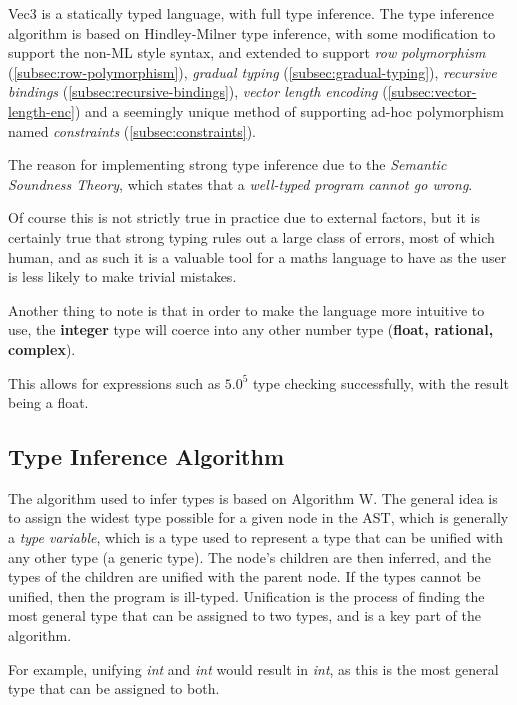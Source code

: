Vec3 is a statically typed language, with full type inference.
The type inference algorithm is based on Hindley-Milner type inference\citep{sulzmann2000general}, with some
modification to support the non-ML style syntax, and extended to support \textit{row polymorphism}\citep{morris2019abstracting} (\ref{subsec:row-polymorphism}), \textit{gradual typing}\citep{garcia2016abstracting}
(\ref{subsec:gradual-typing}), \textit{recursive bindings} (\ref{subsec:recursive-bindings}), 
\textit{vector length encoding} (\ref{subsec:vector-length-enc}) and a seemingly unique method of supporting ad-hoc 
polymorphism named \textit{constraints} (\ref{subsec:constraints}).

The reason for implementing strong type inference due to the \textit{Semantic Soundness Theory}\citep{timany2024logical}, which states that a \textit{well-typed program cannot go wrong}.

Of course this is not strictly true in practice due to external factors, but it is certainly true that strong typing
rules out a large class of errors, most of which human, and as such it is a valuable tool for a maths language to
have as the user is less likely to make trivial mistakes.

Another thing to note is that in order to make the language more intuitive to use, the \textbf{integer} type will 
coerce into any other number type (\textbf{float, rational, complex}). 

This allows for expressions such as $5.0 ^ 5$ type checking successfully, with the result being a float.

\subsection{Type Inference Algorithm}\label{subsec:type-inference-algorithm}

The algorithm used to infer types is based on Algorithm W\citep{milner1978theory}.
The general idea is to assign the widest type possible for a given node in the AST, which is generally a
\textit{type variable}, which is a type used to represent a type that can be unified with any other type (a generic
type).
The node's children are then inferred, and the types of the children are unified with the parent node.
If the types cannot be unified, then the program is ill-typed.
Unification is the process of finding the most general type that can be assigned to two types, and is a key part of
the algorithm.

For example, unifying \textit{int} and \textit{int} would result in \textit{int}, as this is the most general type that
can be assigned to both.

